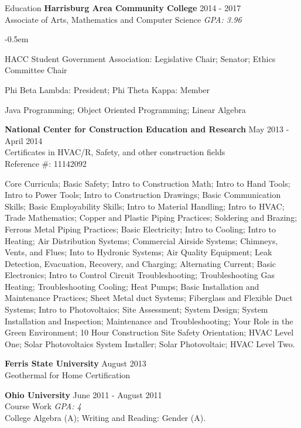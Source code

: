 \documentclass{resume} %
\begin{document}
\begin{rSection}{Education}
{\bf Harrisburg Area Community College} {2014 - 2017} 
\\ Associate of Arts, Mathematics and Computer Science {\em GPA: 3.96}
\begin{rSubSection}{}{
   \itemsep -0.5em \vspace{-1.5em} %
   
    \item {HACC Student Government Association:} Legislative Chair; Senator; Ethics Committee Chair
    \item {Phi Beta Lambda:} President; {Phi Theta Kappa:} Member}
    
  \end{rSubSection}
Java Programming; Object Oriented Programming; Linear Algebra

\iffalse
{\bf National Center for Construction Education and Research} {May 2013 - April 2014} 
\\ Certificates in HVAC/R, Safety, and other construction fields {}
\\ Reference \#: 11142092
\smallskip \\
\item 
Core Curricula; Basic Safety; Intro to Construction Math; Intro to Hand Tools; Intro to Power Tools; Intro to Construction Drawings; Basic Communication Skills; Basic Employability Skills; Intro to Material Handling; Intro to HVAC; Trade Mathematics; Copper and Plastic Piping Practices; Soldering and Brazing; Ferrous Metal Piping Practices; Basic Electricity; Intro to Cooling; Intro to Heating; Air Distribution Systems; Commercial Airside Systems; Chimneys, Vents, and Flues; Into to Hydronic Systems; Air Quality Equipment; Leak Detection, Evacuation, Recovery, and Charging; Alternating Current; Basic Electronics; Intro to Control Circuit Troubleshooting; Troubleshooting Gas Heating; Troubleshooting Cooling; Heat Pumps; Basic Installation and Maintenance Practices; Sheet Metal duct Systems; Fiberglass and Flexible Duct Systems; Intro to Photovoltaics; Site Assessment; System Design; System Installation and Inspection; Maintenance and Troubleshooting; Your Role in the Green Environment; 10 Hour Construction Site Safety Orientation; HVAC Level One; Solar Photovoltaics System Installer; Solar Photovoltaic; HVAC Level Two.


{\bf Ferris State University} {August 2013} 
\\ Geothermal for Home Certification {}


{\bf Ohio University} {June 2011 - August 2011} 
\\ Course Work {\em GPA: 4}
\smallskip \\
College Algebra (A); Writing and Reading: Gender (A).


\end{rSection}
\end{document}
